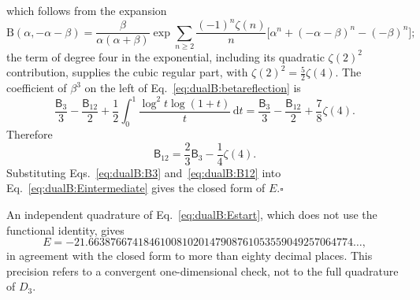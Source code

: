 \documentclass[11pt,a4paper]{article}
\numberwithin{equation}{section}
\newcommand{\dd}{\,\mathrm d}
\begin{document}
which follows from the expansion
\begin{equation}
 \mathrm B(\alpha,-\alpha-\beta)=\frac{\beta}{\alpha(\alpha+\beta)}\exp\sum_{n\ge2}\frac{(-1)^n\zeta(n)}{n}
 \bigl[\alpha^n+(-\alpha-\beta)^n-(-\beta)^n\bigr];
\end{equation}
the term of degree four in the exponential, including its quadratic $\zeta(2)^2$ contribution, supplies the cubic
regular part, with $\zeta(2)^2=\frac52\zeta(4)$. The coefficient of $\beta^3$ on the left of
Eq.~\eqref{eq:dualB:betareflection} is
\begin{equation}
 \frac{\mathsf B_3}{3}-\frac{\mathsf B_{12}}{2}+\frac12\int_0^1\frac{\log^2t\log(1+t)}{t}\dd t
 =\frac{\mathsf B_3}{3}-\frac{\mathsf B_{12}}{2}+\frac78\zeta(4).
\end{equation}
Therefore
\begin{equation}
 \mathsf B_{12}=\frac23\mathsf B_3-\frac14\zeta(4).
 \label{eq:dualB:B12}
\end{equation}
Substituting Eqs.~\eqref{eq:dualB:B3} and~\eqref{eq:dualB:B12} into Eq.~\eqref{eq:dualB:Eintermediate} gives the
closed form of $E$.\hfill$\square$

An independent quadrature of Eq.~\eqref{eq:dualB:Estart}, which does not use the functional identity, gives
\begin{equation}
 E=-21.663876674184610081020147908761053559049257064774\ldots,
\end{equation}
in agreement with the closed form to more than eighty decimal places. This precision refers to a convergent
one-dimensional check, not to the full quadrature of $D_3$.
\end{document}
